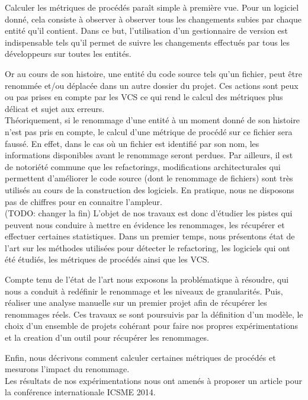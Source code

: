 Calculer les métriques de procédés paraît simple à première vue. Pour un logiciel donné, cela consiste à observer à observer tous les changements subies par chaque entité qu'il contient. Dans ce but, l'utilisation d'un gestionnaire de version est indispensable tels qu'il permet de suivre les changements effectués par tous les développeurs sur toutes les entités. 

Or au cours de son histoire, une entité du code source tels qu'un fichier, peut être renommée et/ou déplacée dans un autre dossier du projet. Ces actions sont peux ou pas prises en compte par les VCS ce qui rend le calcul des métriques plus délicat et sujet aux erreurs.\\

Théoriquement, si le renommage d'une entité à un moment donné de son histoire n'est pas pris en compte, le calcul d'une métrique de procédé sur ce fichier sera faussé. En effet, dans le cas où un fichier est identifié par son nom, les informations disponibles avant le renommage seront perdues. Par ailleurs, il est de notoriété commune que les refactorings, modifications architecturales qui permettent d'améliorer le code source (dont le renommage de fichiers) sont très utilisés au cours de la construction des logiciels. En pratique, nous ne disposons pas de chiffres pour en connaitre l'ampleur.\\

(TODO: changer la fin)
L’objet de nos travaux est donc d’étudier les pistes qui peuvent nous conduire à mettre en évidence les renommages, les récupérer et effectuer certaines statistiques.
Dans un premier temps, nous présentons état de l'art sur les méthodes utilisées pour détecter le refactoring, les logiciels qui ont été étudiés, les métriques de procédés ainsi que les VCS. 

Compte tenu de l'état de l'art nous exposons la problématique à résoudre, qui nous a conduit à redéfinir le renommage et les niveaux de granularités. Puis, réaliser une analyse manuelle sur un premier projet afin de récupérer les renommages réels. Ces travaux se sont poursuivis par la définition d'un modèle, le choix d'un ensemble de projets cohérant pour faire nos propres expérimentations et la creation d'un outil pour récupérer les renommages.

 Enfin, nous décrivons comment calculer certaines métriques de procédés et mesurons l'impact du renommage.\\
 Les résultats de nos expérimentations nous ont amenés à proposer un article pour la conférence internationale ICSME 2014.\\


